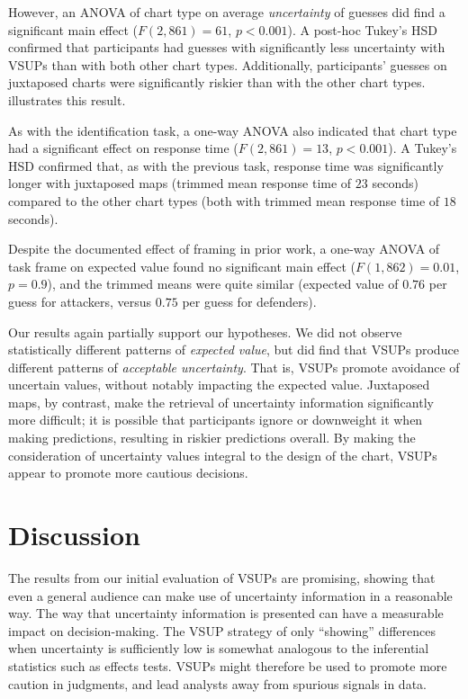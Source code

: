 However, an ANOVA of chart type on average \emph{uncertainty} of guesses did find a significant main effect ($F(2,861)=61$, $p<0.001$). A post-hoc Tukey's HSD confirmed that participants had guesses with significantly less uncertainty with VSUPs than with both other chart types. Additionally, participants' guesses on juxtaposed charts were significantly riskier than with the other chart types.  illustrates this result.

As with the identification task, a one-way ANOVA also indicated that chart type had a significant effect on response time ($F(2,861)=13$, $p<0.001$). A Tukey's HSD confirmed that, as with the previous task, response time was significantly longer with juxtaposed maps (trimmed mean response time of $23$ seconds) compared to the other chart types (both with trimmed mean response time of $18$ seconds).

Despite the documented effect of framing in prior work, a one-way ANOVA of task frame on expected value found no significant main effect ($F(1,862)=0.01$, $p=0.9$), and the trimmed means were quite similar (expected value of $0.76$ per guess for attackers, versus $0.75$ per guess for defenders).

Our results again partially support our hypotheses. We did not observe statistically different patterns of \emph{expected value}, but did find that VSUPs produce different patterns of \emph{acceptable uncertainty}. That is, VSUPs promote avoidance of uncertain values, without notably impacting the expected value. Juxtaposed maps, by contrast, make the retrieval of uncertainty information significantly more difficult; it is possible that participants ignore or downweight it when making predictions, resulting in riskier predictions overall. By making the consideration of uncertainty values integral to the design of the chart, VSUPs appear to promote more cautious decisions.

\section{Discussion}

\sizeFig

The results from our initial evaluation of VSUPs are promising, showing that even a general audience can make use of uncertainty information in a reasonable way. The way that uncertainty information is presented can have a measurable impact on decision-making. The VSUP strategy of only ``showing'' differences when uncertainty is sufficiently low is somewhat analogous to the inferential statistics such as effects tests. VSUPs might therefore be used to promote more caution in judgments, and lead analysts away from spurious signals in data.

